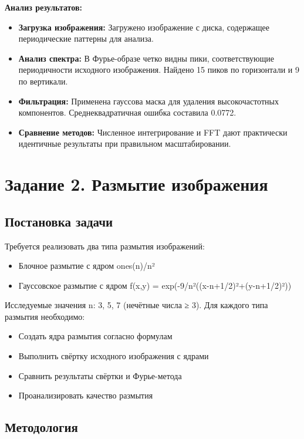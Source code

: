 \textbf{Анализ результатов:}
\begin{itemize}
    \item \textbf{Загрузка изображения:} Загружено изображение с диска, содержащее периодические паттерны для анализа.
    
    \item \textbf{Анализ спектра:} В Фурье-образе четко видны пики, соответствующие периодичности исходного изображения. Найдено 15 пиков по горизонтали и 9 по вертикали.
    
    \item \textbf{Фильтрация:} Применена гауссова маска для удаления высокочастотных компонентов. Среднеквадратичная ошибка составила 0.0772.
    
    \item \textbf{Сравнение методов:} Численное интегрирование и FFT дают практически идентичные результаты при правильном масштабировании.
\end{itemize}

\section*{Задание 2. Размытие изображения}

\subsection*{Постановка задачи}

Требуется реализовать два типа размытия изображений:
\begin{itemize}
    \item Блочное размытие с ядром ones(n)/n²
    \item Гауссовское размытие с ядром f(x,y) = exp(-9/n²((x-n+1/2)²+(y-n+1/2)²))
\end{itemize}

Исследуемые значения n: 3, 5, 7 (нечётные числа ≥ 3). Для каждого типа размытия необходимо:
\begin{itemize}
    \item Создать ядра размытия согласно формулам
    \item Выполнить свёртку исходного изображения с ядрами
    \item Сравнить результаты свёртки и Фурье-метода
    \item Проанализировать качество размытия
\end{itemize}

\subsection*{Методология}

